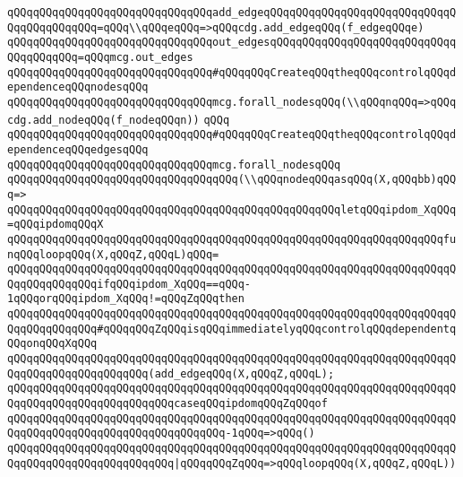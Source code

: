 \verb|qQQqqQQqqQQqqQQqqQQqqQQqqQQqqQQqadd_edgeqQQqqQQqqQQqqQQqqQQqqQQqqQQqqQQqqQQqqQQqqQQq=qQQq\\qQQqeqQQq=>qQQqcdg.add_edgeqQQq(f_edgeqQQqe)|\newline
\verb|qQQqqQQqqQQqqQQqqQQqqQQqqQQqqQQqout_edgesqQQqqQQqqQQqqQQqqQQqqQQqqQQqqQQqqQQqqQQq=qQQqmcg.out_edges|\newline
\newline
\verb|qQQqqQQqqQQqqQQqqQQqqQQqqQQqqQQq#qQQqqQQqCreateqQQqtheqQQqcontrolqQQqdependenceqQQqnodesqQQq|\newline
\verb|qQQqqQQqqQQqqQQqqQQqqQQqqQQqqQQqmcg.forall_nodesqQQq(\\qQQqnqQQq=>qQQqcdg.add_nodeqQQq(f_nodeqQQqn))|\newline
\verb|qQQq|\newline
\verb|qQQqqQQqqQQqqQQqqQQqqQQqqQQqqQQq#qQQqqQQqCreateqQQqtheqQQqcontrolqQQqdependenceqQQqedgesqQQq|\newline
\verb|qQQqqQQqqQQqqQQqqQQqqQQqqQQqqQQqmcg.forall_nodesqQQq|\newline
\verb|qQQqqQQqqQQqqQQqqQQqqQQqqQQqqQQqqQQq(\\qQQqnodeqQQqasqQQq(X,qQQqbb)qQQq=>|\newline
\verb|qQQqqQQqqQQqqQQqqQQqqQQqqQQqqQQqqQQqqQQqqQQqqQQqqQQqletqQQqipdom_XqQQq=qQQqipdomqQQqX|\newline
\verb|qQQqqQQqqQQqqQQqqQQqqQQqqQQqqQQqqQQqqQQqqQQqqQQqqQQqqQQqqQQqqQQqqQQqfunqQQqloopqQQq(X,qQQqZ,qQQqL)qQQq=|\newline
\verb|qQQqqQQqqQQqqQQqqQQqqQQqqQQqqQQqqQQqqQQqqQQqqQQqqQQqqQQqqQQqqQQqqQQqqQQqqQQqqQQqqQQqifqQQqipdom_XqQQq==qQQq-1qQQqorqQQqipdom_XqQQq!=qQQqZqQQqthen|\newline
\verb|qQQqqQQqqQQqqQQqqQQqqQQqqQQqqQQqqQQqqQQqqQQqqQQqqQQqqQQqqQQqqQQqqQQqqQQqqQQqqQQqqQQq#qQQqqQQqZqQQqisqQQqimmediatelyqQQqcontrolqQQqdependentqQQqonqQQqXqQQq|\newline
\verb|qQQqqQQqqQQqqQQqqQQqqQQqqQQqqQQqqQQqqQQqqQQqqQQqqQQqqQQqqQQqqQQqqQQqqQQqqQQqqQQqqQQqqQQqqQQq(add_edgeqQQq(X,qQQqZ,qQQqL);|\newline
\verb|qQQqqQQqqQQqqQQqqQQqqQQqqQQqqQQqqQQqqQQqqQQqqQQqqQQqqQQqqQQqqQQqqQQqqQQqqQQqqQQqqQQqqQQqqQQqqQQqcaseqQQqipdomqQQqZqQQqof|\newline
\verb|qQQqqQQqqQQqqQQqqQQqqQQqqQQqqQQqqQQqqQQqqQQqqQQqqQQqqQQqqQQqqQQqqQQqqQQqqQQqqQQqqQQqqQQqqQQqqQQqqQQqqQQq-1qQQq=>qQQq()|\newline
\verb|qQQqqQQqqQQqqQQqqQQqqQQqqQQqqQQqqQQqqQQqqQQqqQQqqQQqqQQqqQQqqQQqqQQqqQQqqQQqqQQqqQQqqQQqqQQqqQQq|\verb#|qQQqqQQqZqQQq=>qQQqloopqQQq(X,qQQqZ,qQQqL))#\newline
